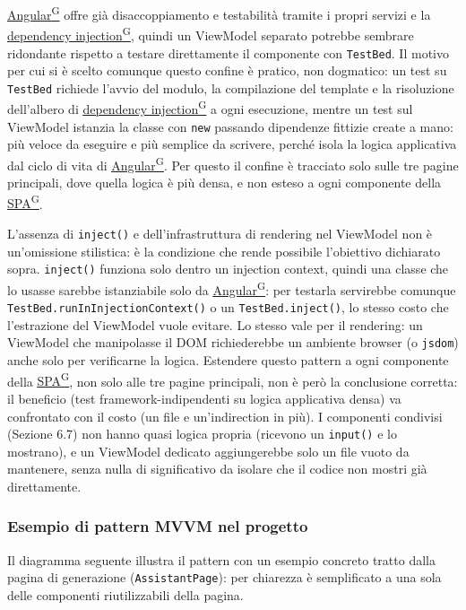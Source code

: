 \documentclass[a4paper,12pt]{article}
\providecommand{\glslink}[2]{\href{https://alittlebyte-19.github.io/Documentazione/glossario.html\#gls-#1}{\underline{#2}\textsuperscript{\scriptsize G}}}
\begin{document}
\begin{sloppypar}
\glslink{angular}{Angular} offre già disaccoppiamento e testabilità tramite i propri servizi e la \glslink{dependency-injection}{dependency injection}, quindi un ViewModel separato potrebbe sembrare ridondante rispetto a testare direttamente il componente con \texttt{TestBed}. Il motivo per cui si è scelto comunque questo confine è pratico, non dogmatico: un test su \texttt{TestBed} richiede l'avvio del modulo, la compilazione del template e la risoluzione dell'albero di \glslink{dependency-injection}{dependency injection} a ogni esecuzione, mentre un test sul ViewModel istanzia la classe con \texttt{new} passando dipendenze fittizie create a mano: più veloce da eseguire e più semplice da scrivere, perché isola la logica applicativa dal ciclo di vita di \glslink{angular}{Angular}. Per questo il confine è tracciato solo sulle tre pagine principali, dove quella logica è più densa, e non esteso a ogni componente della \glslink{spa-single-page-application}{SPA}.

L'assenza di \texttt{inject()} e dell'infrastruttura di rendering nel ViewModel non è un'omissione stilistica: è la condizione che rende possibile l'obiettivo dichiarato sopra. \texttt{inject()} funziona solo dentro un injection context, quindi una classe che lo usasse sarebbe istanziabile solo da \glslink{angular}{Angular}: per testarla servirebbe comunque \texttt{TestBed.runInInjectionContext()} o un \texttt{TestBed.inject()}, lo stesso costo che l'estrazione del ViewModel vuole evitare. Lo stesso vale per il rendering: un ViewModel che manipolasse il DOM richiederebbe un ambiente browser (o \texttt{jsdom}) anche solo per verificarne la logica. Estendere questo pattern a ogni componente della \glslink{spa-single-page-application}{SPA}, non solo alle tre pagine principali, non è però la conclusione corretta: il beneficio (test framework-indipendenti su logica applicativa densa) va confrontato con il costo (un file e un'indirection in più). I componenti condivisi (Sezione 6.7) non hanno quasi logica propria (ricevono un \texttt{input()} e lo mostrano), e un ViewModel dedicato aggiungerebbe solo un file vuoto da mantenere, senza nulla di significativo da isolare che il codice non mostri già direttamente.

\subsubsection{Esempio di pattern MVVM nel progetto}

Il diagramma seguente illustra il pattern con un esempio concreto tratto dalla pagina di generazione (\texttt{AssistantPage}): per chiarezza è semplificato a una sola delle componenti riutilizzabili della pagina.


\end{sloppypar}
\end{document}

